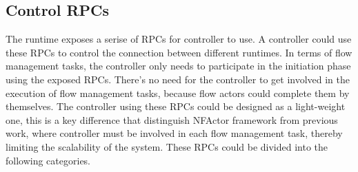\subsection{Control RPCs}

The runtime exposes a serise of RPCs for controller to use. A controller could use these RPCs to control the connection between different runtimes. In terms of flow management tasks, the controller only needs to participate in the initiation phase using the exposed RPCs. There's no need for the controller to get involved in the execution of flow management tasks, because flow actors could complete them by themselves. The controller using these RPCs could be designed as a light-weight one, this is a key difference that distinguish NFActor framework from previous work, where controller must be involved in each flow management task, thereby limiting the scalability of the system. These RPCs could be divided into the following categories.

